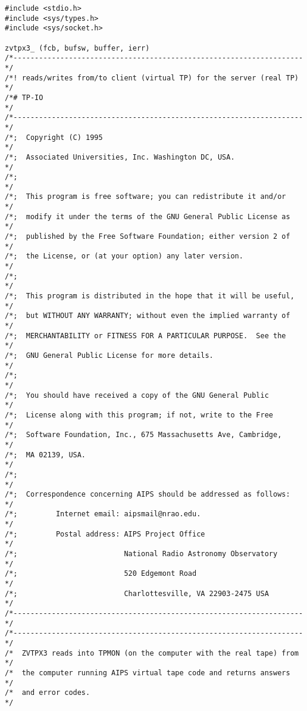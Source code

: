 \begin{center}
\begin{verbatim}
#include <stdio.h>
#include <sys/types.h>
#include <sys/socket.h>

zvtpx3_ (fcb, bufsw, buffer, ierr)
/*--------------------------------------------------------------------*/
/*! reads/writes from/to client (virtual TP) for the server (real TP) */
/*# TP-IO                                                             */
/*--------------------------------------------------------------------*/
/*;  Copyright (C) 1995                                               */
/*;  Associated Universities, Inc. Washington DC, USA.                */
/*;                                                                   */
/*;  This program is free software; you can redistribute it and/or    */
/*;  modify it under the terms of the GNU General Public License as   */
/*;  published by the Free Software Foundation; either version 2 of   */
/*;  the License, or (at your option) any later version.              */
/*;                                                                   */
/*;  This program is distributed in the hope that it will be useful,  */
/*;  but WITHOUT ANY WARRANTY; without even the implied warranty of   */
/*;  MERCHANTABILITY or FITNESS FOR A PARTICULAR PURPOSE.  See the    */
/*;  GNU General Public License for more details.                     */
/*;                                                                   */
/*;  You should have received a copy of the GNU General Public        */
/*;  License along with this program; if not, write to the Free       */
/*;  Software Foundation, Inc., 675 Massachusetts Ave, Cambridge,     */
/*;  MA 02139, USA.                                                   */
/*;                                                                   */
/*;  Correspondence concerning AIPS should be addressed as follows:   */
/*;         Internet email: aipsmail@nrao.edu.                        */
/*;         Postal address: AIPS Project Office                       */
/*;                         National Radio Astronomy Observatory      */
/*;                         520 Edgemont Road                         */
/*;                         Charlottesville, VA 22903-2475 USA        */
/*--------------------------------------------------------------------*/
/*--------------------------------------------------------------------*/
/*  ZVTPX3 reads into TPMON (on the computer with the real tape) from */
/*  the computer running AIPS virtual tape code and returns answers   */
/*  and error codes.                                                  */

\end{verbatim}
\end{center}
